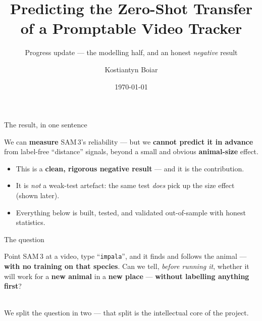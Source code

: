 \documentclass[aspectratio=169,11pt]{beamer}
\title[Progress update]{Predicting the Zero-Shot Transfer of a Promptable Video Tracker}
\subtitle{Progress update --- the modelling half, and an honest \emph{negative} result}
\author{Kostiantyn Boiar}
\institute{MSc Dissertation \,\textbullet\, University of Glasgow\\[2pt]
\small Supervisor: Dr Marwa Mahmoud}
\date{\today}
\begin{document}
\begin{frame}[plain]
  \titlepage
\end{frame}

\begin{frame}{The result, in one sentence}
  \begin{block}{}
    \centering\large
    We can \textbf{measure} SAM\,3's reliability --- but we \textbf{cannot predict it in advance} from
    label-free ``distance'' signals, beyond a small and obvious \textbf{animal-size} effect.
  \end{block}
  \vspace{0.6em}
  \begin{itemize}\footnotesize
    \item This is a \textbf{clean, rigorous negative result} --- and it is the contribution.
    \item It is \emph{not} a weak-test artefact: the same test \emph{does} pick up the size effect (shown later).
    \item Everything below is built, tested, and validated out-of-sample with honest statistics.
  \end{itemize}
\end{frame}

\begin{frame}{The question}
  \begin{block}{}
    \centering
    Point SAM\,3 at a video, type ``\texttt{impala}'', and it finds and follows the animal ---
    \textbf{with no training on that species}. Can we tell, \emph{before running it}, whether it will work
    for a \textbf{new animal} in a \textbf{new place} --- \textbf{without labelling anything first}?
  \end{block}
  \vspace{0.5em}
  \centering
  \\[2pt]
  {\footnotesize We split the question in two --- that split is the intellectual core of the project.}
\end{frame}
\end{document}
